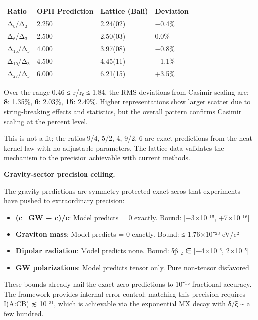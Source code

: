 {\def\LTcaptype{none} %
\begin{longtable}[]{@{}llll@{}}
\toprule\noalign{}
Ratio & OPH Prediction & Lattice (Bali) & Deviation \\
\midrule\noalign{}
\endhead
\bottomrule\noalign{}
\endlastfoot
Δ₈/Δ₃ & 2.250 & 2.24(02) & −0.4\% \\
Δ₆/Δ₃ & 2.500 & 2.50(03) & 0.0\% \\
Δ₁₅/Δ₃ & 4.000 & 3.97(08) & −0.8\% \\
Δ₁₀/Δ₃ & 4.500 & 4.45(11) & −1.1\% \\
Δ₂₇/Δ₃ & 6.000 & 6.21(15) & +3.5\% \\
\end{longtable}
}

Over the range 0.46 ≤ r/r₀ ≤ 1.84, the RMS deviations from Casimir scaling are: \textbf{8}: 1.35\%, \textbf{6}: 2.03\%, \textbf{15}: 2.49\%. Higher representations show larger scatter due to string-breaking effects and statistics, but the overall pattern confirms Casimir scaling at the percent level.

This is not a fit; the ratios 9/4, 5/2, 4, 9/2, 6 are exact predictions from the heat-kernel law with no adjustable parameters. The lattice data validates the mechanism to the precision achievable with current methods.

\textbf{Gravity-sector precision ceiling.}

The gravity predictions are symmetry-protected exact zeros that experiments have pushed to extraordinary precision:

\begin{itemize}
\tightlist
\item
  \textbf{(c\_GW − c)/c}: Model predicts = 0 exactly. Bound: {[}−3×10⁻¹⁵, +7×10⁻¹⁶{]}
\item
  \textbf{Graviton mass}: Model predicts = 0 exactly. Bound: ≤ 1.76×10⁻²³ eV/c²
\item
  \textbf{Dipolar radiation}: Model predicts none. Bound: δ\^{p}₋₂ ∈ {[}−4×10⁻⁶, 2×10⁻⁵{]}
\item
  \textbf{GW polarizations}: Model predicts tensor only. Pure non-tensor disfavored
\end{itemize}

These bounds already nail the exact-zero predictions to 10⁻¹⁵ fractional accuracy. The framework provides internal error control: matching this precision requires I(A:C\textbar B) ≲ 10⁻³¹, which is achievable via the exponential MX decay with δ/ξ \textasciitilde{} a few hundred.

